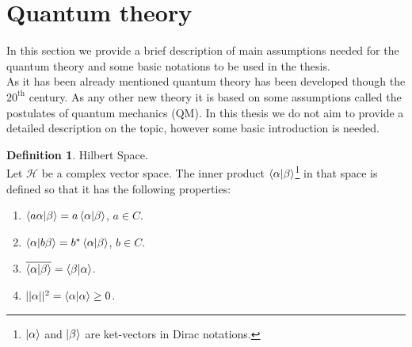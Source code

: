 \documentclass[twoside,english]{uiofysmaster}
\theoremstyle{definition}
\newtheorem{defn}{Definition}
\begin{document}
\section{Quantum theory}
In this section we provide a brief description of main assumptions needed for the quantum theory and  some basic notations to be used in the thesis.\\
As it has been already mentioned quantum theory has been developed though the $20^{\text{th}}$ century. As any other new theory it is based on some assumptions called the postulates of quantum mechanics (QM). In this thesis we do not aim to provide a detailed description on the topic, however some basic introduction is needed.\\

\begin{defn} Hilbert Space.\\
	Let $\mathscr{H}$ be a complex vector space. The inner product $\braket{\alpha|\beta} $\footnote{$\ket{\alpha}$ and  $\ket{\beta}$ are ket-vectors in Dirac notations.} in that space is defined so that it has the following properties:
	\begin{enumerate}		
		\item $\braket{a\alpha|\beta} = a\braket{\alpha|\beta}$, $a \in C$.
		\item $\braket{\alpha|b\beta} = b^{*}\braket{\alpha|\beta}$, $b \in C$.
		\item $\overline{\braket{\alpha|\beta}} =\braket{\beta|\alpha}$.
		\item $||\alpha||^2= \braket{\alpha|\alpha} \geq 0 $.			
	\end{enumerate}
\end{defn}
\end{document}
